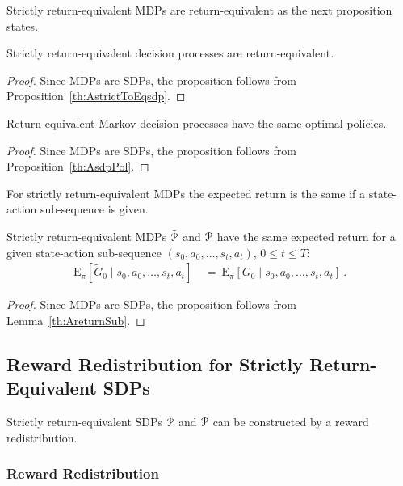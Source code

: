 \documentclass{article}
\newcommand\EXP{\mathbf{\mathrm{E}}}
\renewcommand{\leq}{\leqslant}
\begin{document}
\begin{appendices}
Strictly return-equivalent MDPs are return-equivalent as the
next proposition states.
\begin{propositionA}
\label{th:AstrictToEq}
  Strictly return-equivalent decision processes are return-equivalent.
\end{propositionA}
\begin{proof}
Since MDPs are SDPs, the proposition follows from Proposition~\ref{th:AstrictToEqsdp}.
\end{proof}

\begin{propositionA}
\label{th:AthRE}
  Return-equivalent Markov decision processes have the same optimal policies.
\end{propositionA}
\begin{proof}
Since MDPs are SDPs, the proposition follows from Proposition~\ref{th:AsdpPol}.
\end{proof}



For strictly return-equivalent MDPs the expected return is the same if 
a state-action sub-sequence is given. 
\begin{propositionA}
\label{th:AstrictSub}
Strictly return-equivalent MDPs $\tilde{\mathcal{P}}$ and $\mathcal{P}$
have the same expected return for a given state-action sub-sequence
$(s_0,a_0,\ldots,s_t,a_t)$, $0 \leq t \leq T$:
\begin{align}
   \EXP_{\pi} \left[
    \tilde{G}_0 \mid s_0,a_0,\ldots,s_t,a_t \right] \ &= \
   \EXP_{\pi} \left[
    G_0 \mid s_0,a_0,\ldots,s_t, a_t\right] \ .
  \end{align}
\end{propositionA}
\begin{proof}
Since MDPs are SDPs, the proposition follows from Lemma~\ref{th:AreturnSub}.
\end{proof}


\subsection{Reward Redistribution for Strictly Return-Equivalent SDPs}
\label{sec:rewardRedist}

Strictly return-equivalent SDPs $\tilde{\mathcal{P}}$ and $\mathcal{P}$
can be constructed by a reward redistribution.

\subsubsection{Reward Redistribution}


\end{appendices}
\end{document}
